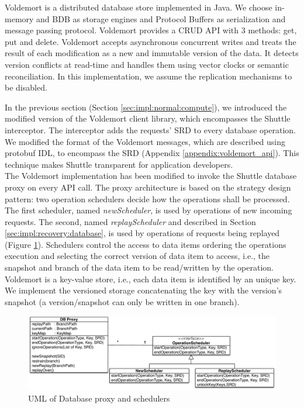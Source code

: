 Voldemort is a distributed database store implemented in Java. We choose in-memory and \acf{BDB} as storage engines and Protocol Buffers as serialization and message passing protocol. Voldemort provides a \acf{CRUD} \ac{API} with 3 methods: get, put and delete. Voldemort accepts asynchronous concurrent writes and treats the result of each modification as a new and immutable version of the data. It detects version conflicts at read-time and handles them using vector clocks or semantic reconciliation. In this implementation, we assume the replication mechanisms to be disabled. 

In the previous section (Section \ref{sec:impl:normal:compute}), we introduced the modified version of the Voldemort client library, which encompasses the Shuttle interceptor. The interceptor adds the requests' \ac{SRD} to every database operation. We modified the format of the Voldemort messages, which are described using \acf{protobuf} \acs{IDL}, to encompass the \ac{SRD} (Appendix \ref{appendix:voldemort_api}). This technique makes Shuttle transparent for application developers.\\


The Voldemort implementation has been modified to invoke the Shuttle database proxy on every \ac{API} call. The proxy architecture is based on the strategy design pattern: two operation schedulers decide how the operations shall be processed. The first scheduler, named \emph{newScheduler}, is used by operations of new incoming requests. The second, named \emph{replayScheduler} and described in Section \ref{sec:impl:recovery:database}, is used by operations of requests being replayed (Figure \ref{fig:scheduler_uml}). Schedulers control the access to data items ordering the operations execution and selecting the correct version of data item to access, i.e., the snapshot and branch of the data item to be read/written by the operation. Voldemort is a key-value store, i.e., each data item is identified by an unique key. We implement the versioned storage concatenating the key with the version's snapshot (a version/snapshot can only be written in one branch).\\

\begin{figure}
  \centering
  \includegraphics[width=\textwidth]{arch/scheduler_uml}
  \caption{UML of Database proxy and schedulers}
  \label{fig:scheduler_uml}
\end{figure}

